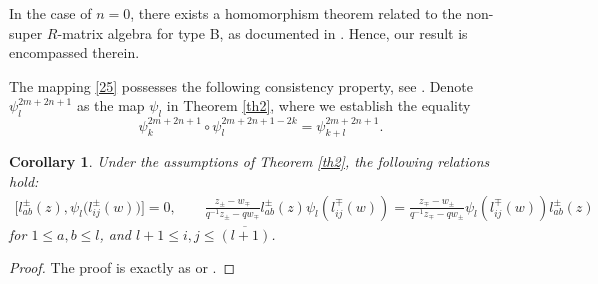 \documentclass[10pt,a4paper]{amsart}
\numberwithin{equation}{section}
\newtheorem{Corollary}[Theorem]{Corollary}
\begin{document}
\begin{Remark}\label{RM3}
In the case of $n=0$, there exists a homomorphism theorem related to the non-super $R$-matrix algebra for type B, as documented in \cite[Theorem 3.7]{JMAB}. Hence, our result is encompassed therein.
\end{Remark}

The mapping \eqref{25} possesses the following consistency property, see \cite{IGA}. Denote $\psi^{2m+2n+1}_l$ as the map $\psi_l$ in Theorem \ref{th2}, where we establish the equality
\begin{equation*}%
 \psi^{2m+2n+1}_k\circ\psi^{2m+2n+1-2k}_l=\psi^{2m+2n+1}_{k+l}.
\end{equation*}

\begin{Corollary}\label{co1}
Under the assumptions of Theorem {\rm\ref{th2}}, the following relations hold:
\begin{gather*}
 \bigl[l_{ab}^{\pm}(z), \psi_l\bigl( l_{ij}^{\pm}(w)\bigr)\bigr] = 0, \qquad
 \frac{z_{\pm}-w_{\mp}}{q^{-1}z_{\pm}-qw_{\mp}}l_{ab}^{\pm}(z)\psi_l( l_{ij}^{\mp}(w))=\frac{z_{\mp}-w_{\pm}}{q^{-1}z_{\mp}-qw_{\pm}}\psi_l( l_{ij}^{\mp}(w))l_{ab}^{\pm}(z)
\end{gather*}
for $1\leq a,b\leq l$, and $l+1\leq i,j\leq \overline{(l+1)}$.
\end{Corollary}

\begin{proof}
The proof is exactly as \cite[Corollary 3.10]{JMA} or \cite[Corollary 3.8]{JMAB}.
\end{proof}
\end{document}
